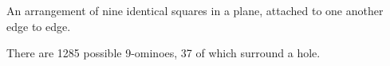  An arrangement of nine identical squares in a plane, 
attached to one another edge to edge.
\par
There are 1285 possible 9-ominoes, 37 of which surround a hole.
